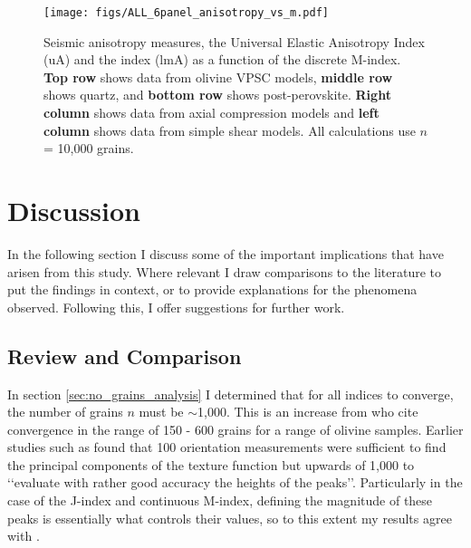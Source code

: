 \documentclass[a4paper,12pt,twoside]{report}
\numberwithin{equation}{chapter}
\begin{document}
\begin{figure*}[p]
  \centering
    \texttt{[image: figs/ALL\_6panel\_anisotropy\_vs\_m.pdf]}
  \caption[Relationship of anisotropy indices and M-index (disc)]{Seismic anisotropy measures, the Universal Elastic Anisotropy Index (uA) and the \cite{Ledbetter2006} index (lmA) as a function of the discrete M-index. \textbf{Top row} shows data from olivine VPSC models, \textbf{middle row} shows quartz, and \textbf{bottom row} shows post-perovskite. \textbf{Right column} shows data from axial compression models and \textbf{left column} shows data from simple shear models. All calculations use $n$ = 10,000 grains.} 
  \label{fig:ani_vs_m_disc}
\end{figure*} 
 
\chapter{Discussion} \label{chap:discussion}
\vspace{-1cm}
In the following section I discuss some of the important implications that have arisen from this study. Where relevant I draw comparisons to the literature to put the findings in context, or to provide explanations for the phenomena observed. Following this, I offer suggestions for further work.


\section{Review and Comparison} \label{sec:diss_results_comp}

In section \ref{sec:no_grains_analysis} I determined that for all indices to converge, the number of grains $n$ must be $\sim$1,000. This is an increase from \cite{Skemer} who cite convergence in the range of 150 - 600 grains for a range of olivine samples. Earlier studies such as \cite{Baudin1993} found that 100 orientation measurements were sufficient to find the principal components of the texture function but upwards of 1,000 to \lq\lq{}evaluate with rather good accuracy the heights of the peaks\rq\rq{}. Particularly in the case of the J-index and continuous M-index, defining the magnitude of these peaks is essentially what controls their values, so to this extent my results agree with \cite{Baudin1993}. 
\end{document}
